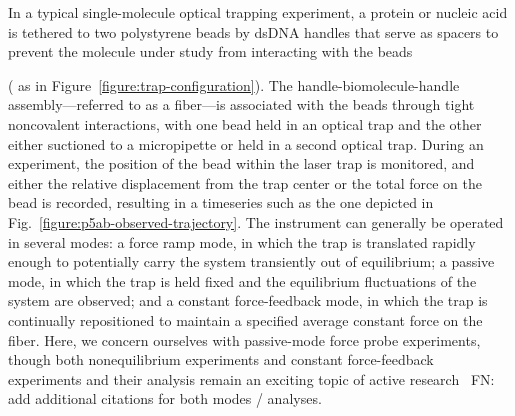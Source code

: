 \documentclass[aps,pre,twocolumn,superscriptaddress,nofootinbib,longbibliography]{revtex4-1}
\begin{document}
In a typical single-molecule optical trapping experiment, a protein or nucleic acid is tethered to two polystyrene beads by dsDNA handles that {\color{red}serve as spacers to} prevent the molecule under study from interacting with the beads {({\color{red} as in Figure~\ref{figure:trap-configuration})}.
The handle-biomolecule-handle assembly---referred to as a fiber---is associated with the beads through tight noncovalent interactions, with one bead held in an optical trap and the other either suctioned to a micropipette or held in a second optical trap.
During an experiment, the position of the bead within the laser trap is monitored, and either the relative displacement from the trap center or the total force on the bead is recorded, resulting in a timeseries such as the one depicted in Fig.~\ref{figure:p5ab-observed-trajectory}.
{\color{red}The instrument can generally be operated in several modes: a force ramp mode, in which the trap is translated rapidly enough to potentially carry the system {\color{red}transiently} out of equilibrium; a passive mode, in which the trap is held fixed and the equilibrium fluctuations of the system are observed; and a constant force-feedback mode, in which the trap is continually repositioned to maintain a specified average constant force on the fiber.}
Here, we concern ourselves with passive-mode force probe experiments, though both nonequilibrium experiments and constant force-feedback experiments and their analysis remain an exciting topic of active research~\cite{ritort:adv-chem-phys:2008:nonequilibrium-review,elms:biophys-j:2012:force-feedback}
{\color{magenta}FN: add additional citations for both modes / analyses}.

}
\end{document}
